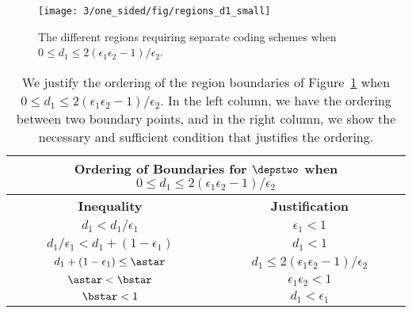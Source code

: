 
\begin{figure}
	\centering
	\texttt{[image: 3/one\_sided/fig/regions\_d1\_small]}
	\caption{The different regions requiring separate coding schemes when $0 \leq d_1 \leq 2(\epsilon_1\epsilon_2 - 1)/\epsilon_2$.}
	\label{fig:regions_d1_small}
\end{figure}

\begin{table}
	\begin{center}
		\begin{tabular}{| c | c |}
			\hline
			\multicolumn{2}{|c|}{{\bf Ordering of Boundaries for $\depstwo$ when $0 \leq d_1 \leq 2(\epsilon_1\epsilon_2 - 1)/\epsilon_2$}} \\
			\hline
			{\bf Inequality} & {\bf Justification}   \\ \hline
			$d_1 < d_1/\epsilon_1$ & $\epsilon_1 < 1$ \\ \hline 
			$d_1/\epsilon_1 < d_1 + (1 - \epsilon_1)$ & $d_1 < 1$ \\ \hline 
			$d_1 + (1 - \epsilon_1) \leq \astar$ & $d_1 \leq 2(\epsilon_1\epsilon_2 - 1)/\epsilon_2$ \\ \hline 
			$\astar < \bstar$ & $\epsilon_1\epsilon_2 < 1$ \\ \hline 
			$\bstar < 1$ & $d_1 < \epsilon_1$ \\
			\hline
		\end{tabular}
	\end{center}
	\caption{We justify the ordering of the region boundaries of Figure~\ref{fig:regions_d1_small} when $0 \leq d_1 \leq 2(\epsilon_1\epsilon_2 - 1)/\epsilon_2$.  In the left column, we have the ordering between two boundary points, and in the right column, we show the necessary and sufficient condition that justifies the ordering.}	
	\label{tab:d1_small}
\end{table}